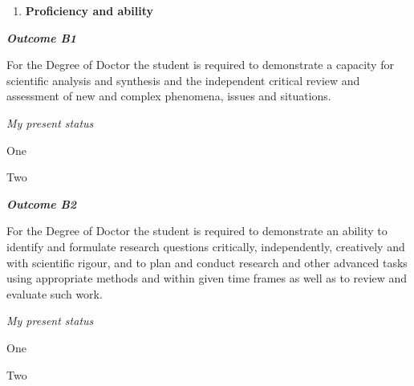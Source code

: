 \begin{enumerate}[resume, label=\textbf{\Alph*.}]
\item \textbf{Proficiency and ability}
\end{enumerate}

\hfill\begin{minipage}{\dimexpr\textwidth-1cm}
\noindent \textbf{\emph{Outcome B1}}

\noindent For the Degree of Doctor the student is required to demonstrate a capacity for scientific analysis and synthesis and the independent critical review and assessment of new and complex phenomena, issues and situations.\\

\xdef\tpd{\the\prevdepth}

\end{minipage}

\noindent \emph{My present status}
\begin{outcomes}
    \item One
    \item Two
\end{outcomes}

















\vspace{1em}
\hfill\begin{minipage}{\dimexpr\textwidth-1cm}
\noindent \textbf{\emph{Outcome B2}}

\noindent For the Degree of Doctor the student is required to demonstrate an ability to identify and formulate research questions critically, independently, creatively and with scientific rigour, and to plan and conduct research and other advanced tasks using appropriate methods and within given time frames as well as to review and evaluate such work.\\

\xdef\tpd{\the\prevdepth}

\end{minipage}

\noindent \emph{My present status}
\begin{outcomes}
    \item One
    \item Two
\end{outcomes}

















